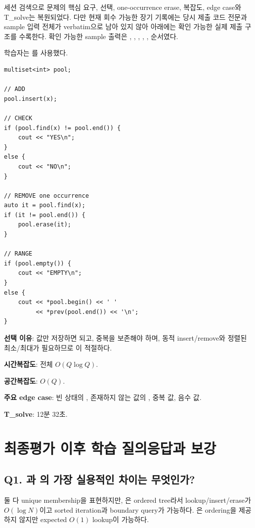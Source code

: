 \begin{notebox}[세션 복원 상태]
세션 검색으로 문제의 핵심 요구,  선택, one-occurrence erase, 복잡도, edge case와 T\_solve는 복원되었다. 다만 현재 회수 가능한 장기 기록에는 당시 제출 코드 전문과 sample 입력 전체가 verbatim으로 남아 있지 않아 아래에는 확인 가능한 실제 제출 구조를 수록한다. 확인 가능한 sample 출력은 , , , , ,  순서였다.
\end{notebox}

\begin{answerbox}[학습자 제출 구조]
학습자는 를 사용했다.
\begin{lstlisting}
multiset<int> pool;

// ADD
pool.insert(x);

// CHECK
if (pool.find(x) != pool.end()) {
    cout << "YES\n";
}
else {
    cout << "NO\n";
}

// REMOVE one occurrence
auto it = pool.find(x);
if (it != pool.end()) {
    pool.erase(it);
}

// RANGE
if (pool.empty()) {
    cout << "EMPTY\n";
}
else {
    cout << *pool.begin() << ' '
         << *prev(pool.end()) << '\n';
}
\end{lstlisting}

\textbf{선택 이유}: 값만 저장하면 되고, 중복을 보존해야 하며, 동적 insert/remove와 정렬된 최소/최대가 필요하므로 이 적절하다.

\textbf{시간복잡도}: 전체 $O(Q\log Q)$.

\textbf{공간복잡도}: $O(Q)$.

\textbf{주요 edge case}: 빈 상태의 , 존재하지 않는 값의 , 중복 값, 음수 값.

\textbf{T\_solve}: 12분 32초.
\end{answerbox}

\section{최종평가 이후 학습 질의응답과 보강}

\subsection{Q1. 과 의 가장 실용적인 차이는 무엇인가?}
둘 다 unique membership을 표현하지만, 은 ordered tree라서 lookup/insert/erase가 $O(\log N)$이고 sorted iteration과 boundary query가 가능하다. 은 ordering을 제공하지 않지만 expected $O(1)$ lookup이 가능하다.

